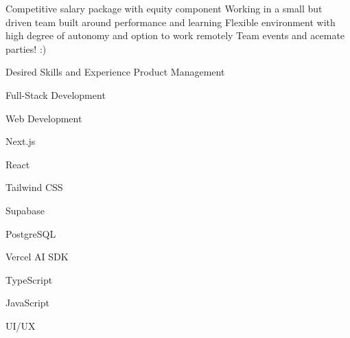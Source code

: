 Competitive salary package with equity component
Working in a small but driven team built around performance and learning
Flexible environment with high degree of autonomy and option to work remotely
Team events and acemate parties! :)


Desired Skills and Experience
Product Management

Full-Stack Development

Web Development

Next.js

React

Tailwind CSS

Supabase

PostgreSQL

Vercel AI SDK

TypeScript

JavaScript

UI/UX